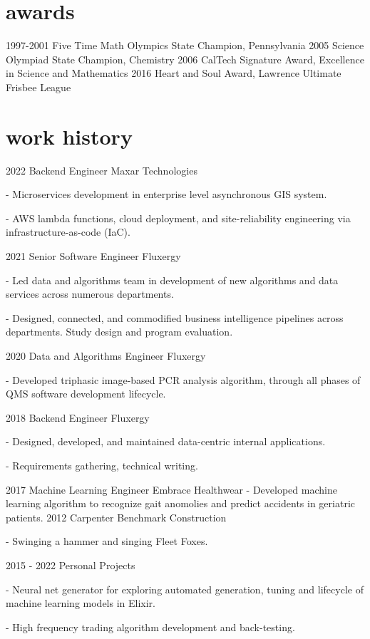 \documentclass[]{twentysecondcv}
\begin{document}

\section{awards}

\begin{twentyshort}
  \twentyitemshort
    {1997-2001}
	{Five Time Math Olympics State Champion, Pennsylvania}
  \twentyitemshort
    {2005}
    {Science Olympiad State Champion, Chemistry}
  \twentyitemshort
    {2006}
    {CalTech Signature Award, Excellence in Science and Mathematics}
  \twentyitemshort
    {2016}
    {Heart and Soul Award, Lawrence Ultimate Frisbee League}
\end{twentyshort}


\section{work history}

\begin{twenty}
  \twentyitem
    {2022}
    {Backend Engineer}
    {Maxar Technologies}
    {- Microservices development in enterprise level asynchronous GIS system. 

	- AWS lambda functions, cloud deployment, and site-reliability engineering via infrastructure-as-code (IaC).

}

  \twentyitem
    {2021}
    {Senior Software Engineer}
    {Fluxergy}
    {- Led data and algorithms team in development of new algorithms and data services across numerous departments.

	- Designed, connected, and commodified business intelligence pipelines across departments. Study design and program evaluation.
	} 
  \twentyitem
    {2020}
    {Data and Algorithms Engineer}
    {Fluxergy}
    {- Developed triphasic image-based PCR analysis algorithm, through all phases of QMS software development lifecycle.

	} 
  \twentyitem
    {2018}
    {Backend Engineer}
    {Fluxergy}
    {- Designed, developed, and maintained data-centric internal applications.

	- Requirements gathering, technical writing.
	} 
  \twentyitem
    {2017}
    {Machine Learning Engineer}
    {Embrace Healthwear}
    {- Developed machine learning algorithm to recognize gait anomolies and predict accidents in geriatric patients.
	} 
  \twentyitem
    {2012}
    {Carpenter}
    {Benchmark Construction}
    {- Swinging a hammer and singing Fleet Foxes.

	} 
  \twentyitem
    {2015 - 2022}
    {Personal Projects}
    {}
    {- Neural net generator for exploring automated generation, tuning and lifecycle of machine learning models in Elixir.

	- High frequency trading algorithm development and back-testing.} 
\end{twenty}
\end{document}
